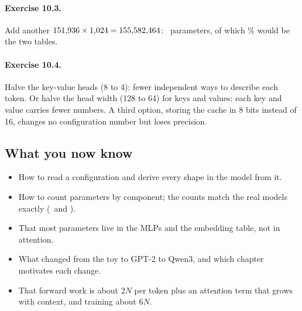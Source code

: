 \paragraph{Exercise 10.3.} Add another $151{,}936\times1{,}024 = 155{,}582{,}464$: \nTenQwenUntied\ parameters, of which
\nTenQwenUntiedShare\% would be the two tables.

\paragraph{Exercise 10.4.} Halve the key-value heads (8 to 4): fewer independent ways to describe each token. Or halve the
head width (128 to 64) for keys and values: each key and value carries fewer numbers. A third option, storing the cache
in 8 bits instead of 16, changes no configuration number but loses precision.

\subsection*{What you now know}
\begin{itemize}
\item How to read a configuration and derive every shape in the model from it.
\item How to count parameters by component; the counts match the real models exactly
(\nTenGptTotal\ and \nTenQwenTotal).
\item That most parameters live in the MLPs and the embedding table, not in attention.
\item What changed from the toy to GPT-2 to Qwen3, and which chapter motivates each change.
\item That forward work is about $2N$ per token plus an attention term that grows with context, and training about $6N$.
\end{itemize}
